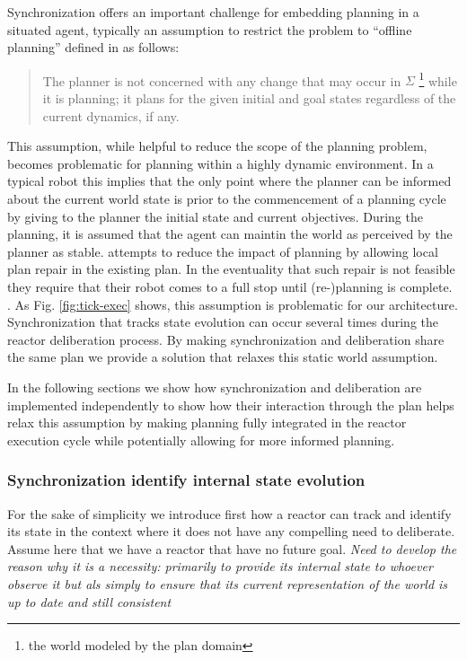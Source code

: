 Synchronization offers an important challenge for embedding planning
in a situated agent, typically %
an assumption to restrict the problem to ``offline planning'' defined
in \cite{ghallab04} as follows:

\begin{quotation}
  The planner is not concerned with any change that may occur in
  $\Sigma$ \footnote{the world modeled by the plan domain} while it is
  planning; it plans for the given initial and goal states regardless
  of the current dynamics, if any. 
\end{quotation}

This assumption, while helpful to reduce the scope of the planning
problem, becomes problematic for planning within a highly dynamic
environment. In a typical robot this implies that the only point where
the planner can be informed about the current world state is prior to
the commencement of a planning cycle by giving to the planner the
initial state and current objectives. During the planning, it is
assumed that the agent can maintin the world as perceived by the
planner as stable. \cite{lemai04, lemai-chenevier2004} attempts to
reduce the impact of planning by allowing local plan repair in the
existing plan. In the eventuality that such repair is not feasible
they require that their robot comes to a full stop until (re-)planning
is complete. . As Fig.
\ref{fig:tick-exec} shows, this assumption is problematic for our
architecture. Synchronization that tracks state evolution can occur
several times during the reactor deliberation process. By making
synchronization and deliberation share the same plan we provide a
solution that relaxes this static world assumption. 

In the following sections we show how synchronization and deliberation
are implemented independently to show how their interaction through
the plan helps relax this assumption by making planning fully
integrated in the reactor execution cycle while potentially allowing
for more informed planning.

\subsubsection{Synchronization identify internal state evolution}
\label{sec:arch:synch}

For the sake of simplicity we introduce first how a reactor can track
and identify its state in the context where it does not have any
compelling need to deliberate. Assume here that we have a reactor that
have no future goal. {\em Need to develop the reason why it is a
  necessity: primarily to provide its internal state to whoever
  observe it but als simply to ensure that its current representation
  of the world is up to date and still consistent}

